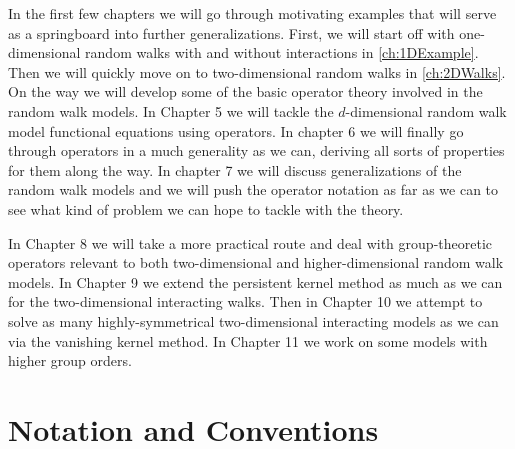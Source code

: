 In the first few chapters we will go through motivating examples that will serve as a springboard into further generalizations. First, we will start off with one-dimensional random walks with and without interactions in \autoref{ch:1DExample}. Then we will quickly move on to two-dimensional random walks in \autoref{ch:2DWalks}. On the way we will develop some of the basic operator theory involved in the random walk models. In Chapter 5 we will tackle the $d$-dimensional random walk model functional equations using operators. In chapter 6 we will finally go through operators in a much generality as we can, deriving all sorts of properties for them along the way. In chapter 7 we will discuss generalizations of the random walk models and we will push the operator notation as far as we can to see what kind of problem we can hope to tackle with the theory.

In Chapter 8 we will take a more practical route and deal with group-theoretic operators relevant to both two-dimensional and higher-dimensional random walk models. In Chapter 9 we extend the persistent kernel method as much as we can for the two-dimensional interacting walks. Then in Chapter 10 we attempt to solve as many highly-symmetrical two-dimensional interacting models as we can via the vanishing kernel method. In Chapter 11 we work on some models with higher group orders.

\section{Notation and Conventions}

